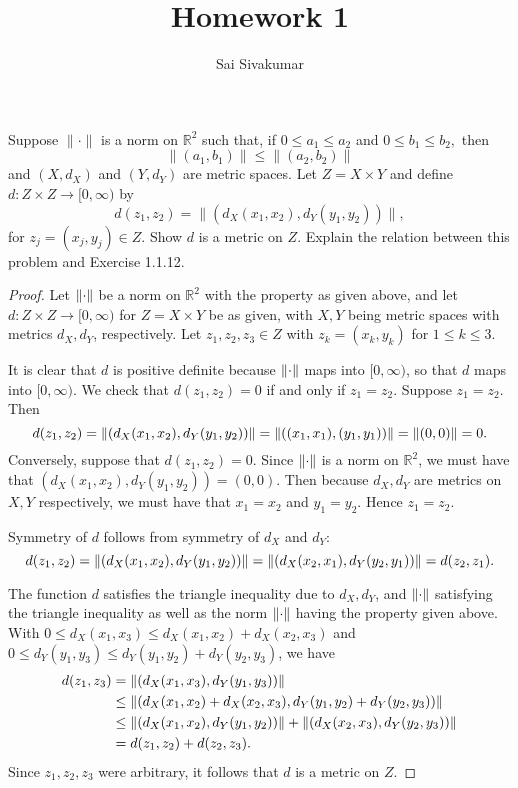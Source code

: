 \documentclass[12pt]{amsart}
\title{Homework 1}
\author{Sai Sivakumar}
\newcommand{\RR}{\mathbb{R}}
\begin{document}
\maketitle

Suppose $\|\cdot\|$ is a norm on $\RR^2$ such that,
 if $0\le a_1\le a_2$ and $0\le b_1\le b_2,$ then
\[
 \|(a_1,b_1)\|\le \|(a_2,b_2)\|
\]
 and $(X,d_X)$ and $(Y,d_Y)$ are metric spaces.
 Let $Z=X\times Y$ and define $d:Z\times Z\to [0,\infty)$ by
\[
  d(z_1,z_2)= \|(d_X(x_1,x_2),d_Y(y_1,y_2))\|,
\]
for  $z_j=(x_j,y_j) \in Z.$
 Show $d$ is a metric on $Z.$  Explain the relation between
 this problem and Exercise 1.1.12.

\begin{proof}
Let $\norm{\cdot}$ be a norm on $\mathbb{R}^2$ with the property as given above, and let $d\colon Z\times Z\to [0,\infty)$ for $Z = X\times Y$ be as given, with $X,Y$ being metric spaces with metrics $d_X,d_Y$, respectively. Let $z_1,z_2,z_3\in Z$ with $z_k = (x_k,y_k)$ for $1\leq k\leq 3$.

It is clear that $d$ is positive definite because $\norm{\cdot}$ maps into $[0,\infty)$, so that $d$ maps into $[0,\infty)$. We check that $d(z_1,z_2) = 0$ if and only if $z_1 = z_2$. Suppose $z_1 = z_2$. Then
\[d(z_1,z_2) = \norm{(d_X(x_1,x_2),d_Y(y_1, y_2))} = \norm{((x_1,x_1),(y_1, y_1))} = \norm{(0,0)} = 0.\]
Conversely, suppose that $d(z_1,z_2) = 0$. Since $\norm{\cdot}$ is a norm on $\mathbb{R}^2$, we must have that $(d_X(x_1,x_2), d_Y(y_1,y_2)) = (0,0)$. Then because $d_X,d_Y$ are metrics on  $X,Y$ respectively, we must have that $x_1 = x_2$ and $y_1 = y_2$. Hence $z_1 = z_2$.

Symmetry of $d$ follows from symmetry of $d_X$ and $d_Y$: \[d(z_1,z_2) = \norm{(d_X(x_1,x_2),d_Y(y_1,y_2))} = \norm{(d_X(x_2,x_1),d_Y(y_2,y_1))} = d(z_2,z_1).\]

The function $d$ satisfies the triangle inequality due to $d_X,d_Y$, and $\norm{\cdot}$ satisfying the triangle inequality as well as the norm $\norm{\cdot}$ having the property given above. With $0 \leq d_X(x_1,x_3)\leq d_X(x_1,x_2) + d_X(x_2,x_3)$ and $0\leq d_Y(y_1,y_3)\leq d_Y(y_1,y_2) + d_Y(y_2,y_3)$, we have \begin{align*}
  d(z_1,z_3) &= \norm{(d_X(x_1,x_3),d_Y(y_1,y_3))}\\
  &\leq \norm{(d_X(x_1,x_2) + d_X(x_2,x_3),d_Y(y_1,y_2) + d_Y(y_2,y_3))}\\
  &\leq \norm{(d_X(x_1,x_2),d_Y(y_1,y_2))} + \norm{(d_X(x_2,x_3),d_Y(y_2,y_3))}\\
  &= d(z_1,z_2) + d(z_2,z_3).
\end{align*}
Since $z_1,z_2,z_3$ were arbitrary, it follows that $d$ is a metric on $Z$.
\end{proof}
\end{document}
